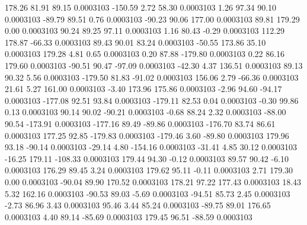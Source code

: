       178.26       81.91       89.15     0.0003103
     -150.59        2.72       58.30     0.0003103
        1.26       97.34       90.10     0.0003103
      -89.79       89.51        0.76     0.0003103
      -90.23       90.06      177.00     0.0003103
       89.81      179.29        0.00     0.0003103
       90.24       89.25       97.11     0.0003103
        1.16       80.43       -0.29     0.0003103
      112.29      178.87      -66.33     0.0003103
       89.43       90.01       83.24     0.0003103
      -50.55      173.86       35.10     0.0003103
      179.28        4.81        0.65     0.0003103
        0.20       87.88     -179.80     0.0003103
        0.22       86.16      179.60     0.0003103
      -90.51       90.47      -97.09     0.0003103
      -42.30        4.37      136.51     0.0003103
       89.13       90.32        5.56     0.0003103
     -179.50       81.83      -91.02     0.0003103
      156.06        2.79      -66.36     0.0003103
       21.61        5.27      161.00     0.0003103
       -3.40      173.96      175.86     0.0003103
       -2.96       94.60      -94.17     0.0003103
     -177.08       92.51       93.84     0.0003103
     -179.11       82.53        0.04     0.0003103
       -0.30       99.86        0.13     0.0003103
       90.14       90.02      -90.21     0.0003103
       -0.68       88.24        2.32     0.0003103
      -88.00       90.54     -173.91     0.0003103
     -177.16       89.49      -89.86     0.0003103
     -176.70       83.74       86.61     0.0003103
      177.25       92.85     -179.83     0.0003103
     -179.46        3.60      -89.80     0.0003103
      179.96       93.18      -90.14     0.0003103
      -29.14        4.80     -154.16     0.0003103
      -31.41        4.85       30.12     0.0003103
      -16.25      179.11     -108.33     0.0003103
      179.44       94.30       -0.12     0.0003103
       89.57       90.42       -6.10     0.0003103
      176.29       89.45        3.24     0.0003103
      179.62       95.11       -0.11     0.0003103
        2.71      179.30        0.00     0.0003103
      -90.04       89.90      170.52     0.0003103
      178.21       97.22      177.43     0.0003103
       18.43        5.32      162.16     0.0003103
      -90.53       89.03       -5.69     0.0003103
      -94.51       85.73        2.45     0.0003103
       -2.73       86.96        3.43     0.0003103
       95.46        3.44       85.24     0.0003103
      -89.75       89.01      176.65     0.0003103
        4.40       89.14      -85.69     0.0003103
      179.45       96.51      -88.59     0.0003103
